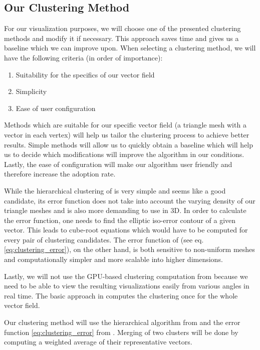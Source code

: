 \subsection{Our Clustering Method}

For our visualization purposes, we will choose one of the presented clustering methods and modify it if necessary. This approach saves time and gives us a baseline which we can improve upon. When selecting a clustering method, we will have the following criteria (in order of importance):

\begin{enumerate}
\item Suitability for the specifics of our vector field
\item Simplicity
\item Ease of user configuration
\end{enumerate}

Methods which are suitable for our specific vector field (a triangle mesh with a vector in each vertex) will help us tailor the clustering process to achieve better results. Simple methods will allow us to quickly obtain a baseline which will help us to decide which modifications will improve the algorithm in our conditions. Lastly, the ease of configuration will make our algorithm user friendly and therefore increase the adoption rate.

While the hierarchical clustering of \citet{Telea99} is very simple and seems like a good candidate, its error function does not take into account the varying density of our triangle meshes and is also more demanding to use in 3D. In order to calculate the error function, one needs to find the elliptic iso-error contour of a given vector. This leads to cube-root equations which would have to be computed for every pair of clustering candidates. The error function of \citet{Peng12} (see eq. \ref{eq:clustering_error}), on the other hand, is both sensitive to non-uniform meshes and computationally simpler and more scalable into higher dimensions.

Lastly, we will not use the GPU-based clustering computation from \citet{Peng12} because we need to be able to view the resulting visualizations easily from various angles in real time. The basic approach in \citet{Telea99} computes the clustering once for the whole vector field.

Our clustering method will use the hierarchical algorithm from \citet{Telea99} and the error function \ref{eq:clustering_error} from \citet{Peng12}. Merging of two clusters will be done by computing a weighted average of their representative vectors.
